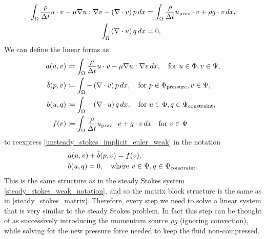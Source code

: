 \documentclass[11pt,a4paper]{memoir}
\newcommand{\om}{{\Omega}}
\begin{document}
\begin{equation}\label{unsteady_stokes_implicit_euler_weak}
\begin{split}
    \int_\om \frac{\rho}{\Delta t} u\cdot v - \mu\nabla u:\nabla v - \left(\nabla\cdot v\right)p\,dx
        &= \int_\om \frac{\rho}{\Delta t}\uprev\cdot v + \rho g \cdot v\,dx,\\
    \quad \int_\om \left(\nabla\cdot u\right) q\,dx &= 0,
\end{split}
\end{equation}
We can define the linear forms as
\begin{equation}
\begin{split}
    a(u, v) &\coloneqq \int_\om\frac{\rho}{\Delta t}u\cdot v -\mu\nabla u : \nabla v\,dx,\quad\text{for $u \in \Phi, v \in \Psi$},\\
    \hat{b}(p, v) &\coloneqq \int_\om-\left(\nabla\cdot v\right)p\,dx,\quad\text{for $p \in \testpressure, v \in \Psi$},\\
    b(u, q) &\coloneqq \int_\om-\left(\nabla\cdot u\right)q\,dx,\quad\text{for $u \in \Phi, q \in \trialconstraint$},\\
    f(v) &\coloneqq \int_\om \frac{\rho}{\Delta t}\uprev\cdot v + g\cdot v\,dx\quad\text{for $v \in \Psi$}
\end{split}
\end{equation}
to reexpress \eqref{unsteady_stokes_implicit_euler_weak} in the notation
\begin{equation}
\begin{split}
    &a(u, v) + \hat{b}(p, v) = f(v),\\
    &b(u, q) = 0, \quad\text{where $v \in \Psi, q \in {\Psi_{\text{constraint}}}$}.
\end{split}
\end{equation}
This is the same structure as in the steady Stokes system \eqref{steady_stokes_weak_notation},
and so the matrix block structure is the same as in \eqref{steady_stokes_matrix}. Therefore, every step we need to solve a linear system
that is very similar to the steady Stokes problem. In fact this step can be thought of as successively introducing the momentum source $\rho g$
(ignoring convection), while solving for the new pressure force needed to keep the fluid non-compressed.
\end{document}
